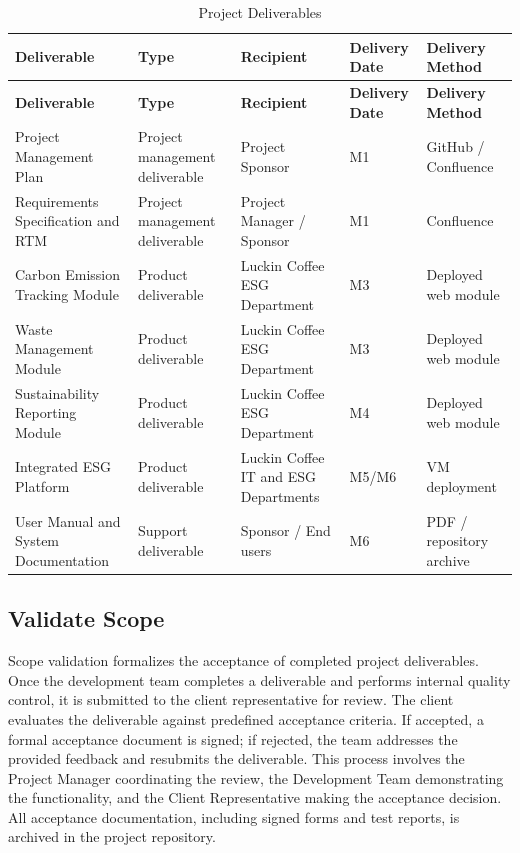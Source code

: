 \documentclass[12pt,a4paper]{article}
\begin{document}
\begin{longtable}{@{}>{\raggedright\arraybackslash}p{3cm}>{\raggedright\arraybackslash}p{2.8cm}>{\raggedright\arraybackslash}p{2.8cm}>{\raggedright\arraybackslash}p{1.8cm}>{\raggedright\arraybackslash}p{2.5cm}@{}}
\caption{Project Deliverables}\label{tab:project_deliverables}\\
\toprule
\textbf{Deliverable} & \textbf{Type} & \textbf{Recipient} & \textbf{Delivery Date} & \textbf{Delivery Method} \\ \midrule
\endfirsthead
\toprule
\textbf{Deliverable} & \textbf{Type} & \textbf{Recipient} & \textbf{Delivery Date} & \textbf{Delivery Method} \\ \midrule
\endhead
Project Management Plan & Project management deliverable & Project Sponsor & M1 & GitHub / Confluence \\
Requirements Specification and RTM & Project management deliverable & Project Manager / Sponsor & M1 & Confluence \\
Carbon Emission Tracking Module & Product deliverable & Luckin Coffee ESG Department & M3 & Deployed web module \\
Waste Management Module & Product deliverable & Luckin Coffee ESG Department & M3 & Deployed web module \\
Sustainability Reporting Module & Product deliverable & Luckin Coffee ESG Department & M4 & Deployed web module \\
Integrated ESG Platform & Product deliverable & Luckin Coffee IT and ESG Departments & M5/M6 & VM deployment \\
User Manual and System Documentation & Support deliverable & Sponsor / End users & M6 & PDF / repository archive \\ \bottomrule
\end{longtable}

\subsection{Validate Scope}
Scope validation formalizes the acceptance of completed project deliverables. Once the development team completes a deliverable and performs internal quality control, it is submitted to the client representative for review. The client evaluates the deliverable against predefined acceptance criteria. If accepted, a formal acceptance document is signed; if rejected, the team addresses the provided feedback and resubmits the deliverable. This process involves the Project Manager coordinating the review, the Development Team demonstrating the functionality, and the Client Representative making the acceptance decision. All acceptance documentation, including signed forms and test reports, is archived in the project repository.
\end{document}
